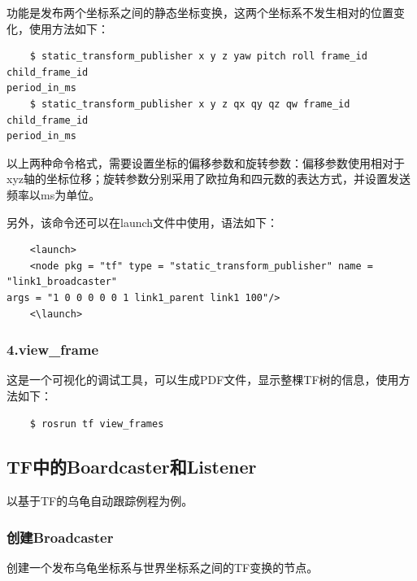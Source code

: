 \documentclass[9pt, oneside]{book}
\begin{document}
功能是发布两个坐标系之间的静态坐标变换，这两个坐标系不发生相对的位置变化，使用方法如下：

\begin{verbatim}
    $ static_transform_publisher x y z yaw pitch roll frame_id child_frame_id 
period_in_ms
    $ static_transform_publisher x y z qx qy qz qw frame_id child_frame_id 
period_in_ms
\end{verbatim}

以上两种命令格式，需要设置坐标的偏移参数和旋转参数：偏移参数使用相对于xyz轴的坐标位移；旋转参数分别采用了欧拉角和四元数的表达方式，并设置发送频率以ms为单位。

另外，该命令还可以在launch文件中使用，语法如下：

\begin{verbatim}
    <launch>
    <node pkg = "tf" type = "static_transform_publisher" name = "link1_broadcaster" 
args = "1 0 0 0 0 0 1 link1_parent link1 100"/>
    <\launch>
\end{verbatim}

\subsubsection{4.view\_frame}

这是一个可视化的调试工具，可以生成PDF文件，显示整棵TF树的信息，使用方法如下：

\begin{verbatim}
    $ rosrun tf view_frames
\end{verbatim}

\subsection{TF中的Boardcaster和Listener}

以基于TF的乌龟自动跟踪例程为例。

\subsubsection{创建Broadcaster}

创建一个发布乌龟坐标系与世界坐标系之间的TF变换的节点。
\end{document}
